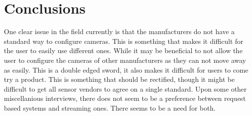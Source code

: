 \section{Conclusions}
One clear issue in the field currently is that the manufacturers do not have a
standard way to configure cameras. This is something that makes it difficult
for the user to easily use different ones. While it may be beneficial to not
allow the user to configure the cameras of other manufacturers as they can not
move away as easily. This is a double edged sword, it also makes it difficult
for users to come try a product. This is something that should be rectified,
though it might be difficult to get all sensor vendors to agree on a single
standard. Upon some other miscellanious interviews, there does not seem to be a
preference between request based systems and streaming ones. There seems to be
a need for both.
